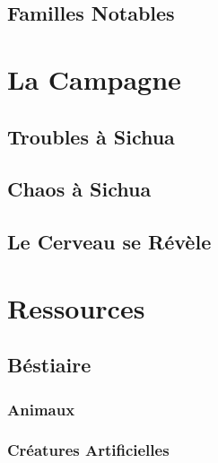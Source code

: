 \documentclass{dd}
\begin{document}
\chapter{Familles Notables}



\part{La Campagne}


\chapter{Troubles à Sichua}



\chapter{Chaos à Sichua}


\chapter{Le Cerveau se Révèle}


\part{Ressources}

\chapter{Béstiaire}

\section{Animaux}



\section{Créatures Artificielles}








\end{document}
